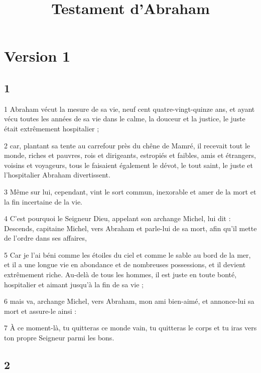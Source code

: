 

\title{Testament d'Abraham}

\part{Version 1}

\chapter{1}

\par 1 Abraham vécut la mesure de sa vie, neuf cent quatre-vingt-quinze ans, et ayant vécu toutes les années de sa vie dans le calme, la douceur et la justice, le juste était extrêmement hospitalier ;

\par 2 car, plantant sa tente au carrefour près du chêne de Mamré, il recevait tout le monde, riches et pauvres, rois et dirigeants, estropiés et faibles, amis et étrangers, voisins et voyageurs, tous le faisaient également le dévot, le tout saint, le juste et l'hospitalier Abraham divertissent.

\par 3 Même sur lui, cependant, vint le sort commun, inexorable et amer de la mort et la fin incertaine de la vie.

\par 4 C'est pourquoi le Seigneur Dieu, appelant son archange Michel, lui dit : Descends, capitaine Michel, vers Abraham et parle-lui de sa mort, afin qu'il mette de l'ordre dans ses affaires,

\par 5 Car je l'ai béni comme les étoiles du ciel et comme le sable au bord de la mer, et il a une longue vie en abondance et de nombreuses possessions, et il devient extrêmement riche. Au-delà de tous les hommes, il est juste en toute bonté, hospitalier et aimant jusqu'à la fin de sa vie ;

\par 6 mais va, archange Michel, vers Abraham, mon ami bien-aimé, et annonce-lui sa mort et assure-le ainsi :

\par 7 À ce moment-là, tu quitteras ce monde vain, tu quitteras le corps et tu iras vers ton propre Seigneur parmi les bons.

\chapter{2}


